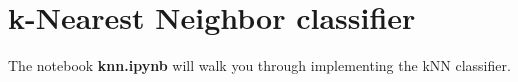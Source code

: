 \section{k-Nearest Neighbor classifier}

The notebook \textbf{knn.ipynb} will walk you through implementing the kNN classifier.


